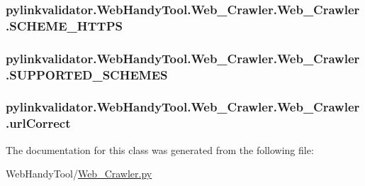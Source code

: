 \subsubsection[{S\+C\+H\+E\+M\+E\+\_\+\+H\+T\+T\+PS}]{\setlength{\rightskip}{0pt plus 5cm}pylinkvalidator.\+Web\+Handy\+Tool.\+Web\+\_\+\+Crawler.\+Web\+\_\+\+Crawler.\+S\+C\+H\+E\+M\+E\+\_\+\+H\+T\+T\+PS}\hypertarget{classpylinkvalidator_1_1_web_handy_tool_1_1_web___crawler_1_1_web___crawler_a42b4d78e04f54d3a3964c9fce45d671a}{}\label{classpylinkvalidator_1_1_web_handy_tool_1_1_web___crawler_1_1_web___crawler_a42b4d78e04f54d3a3964c9fce45d671a}
\subsubsection[{S\+U\+P\+P\+O\+R\+T\+E\+D\+\_\+\+S\+C\+H\+E\+M\+ES}]{\setlength{\rightskip}{0pt plus 5cm}pylinkvalidator.\+Web\+Handy\+Tool.\+Web\+\_\+\+Crawler.\+Web\+\_\+\+Crawler.\+S\+U\+P\+P\+O\+R\+T\+E\+D\+\_\+\+S\+C\+H\+E\+M\+ES}\hypertarget{classpylinkvalidator_1_1_web_handy_tool_1_1_web___crawler_1_1_web___crawler_a25c92404798a0622427d5a2d7a87111f}{}\label{classpylinkvalidator_1_1_web_handy_tool_1_1_web___crawler_1_1_web___crawler_a25c92404798a0622427d5a2d7a87111f}
\subsubsection[{url\+Correct}]{\setlength{\rightskip}{0pt plus 5cm}pylinkvalidator.\+Web\+Handy\+Tool.\+Web\+\_\+\+Crawler.\+Web\+\_\+\+Crawler.\+url\+Correct}\hypertarget{classpylinkvalidator_1_1_web_handy_tool_1_1_web___crawler_1_1_web___crawler_ac5607c7fd029489ae1f1059b923a1c5d}{}\label{classpylinkvalidator_1_1_web_handy_tool_1_1_web___crawler_1_1_web___crawler_ac5607c7fd029489ae1f1059b923a1c5d}


The documentation for this class was generated from the following file\+:\begin{DoxyCompactItemize}
\item 
Web\+Handy\+Tool/\hyperlink{_web_handy_tool_2_web___crawler_8py}{Web\+\_\+\+Crawler.\+py}\end{DoxyCompactItemize}
